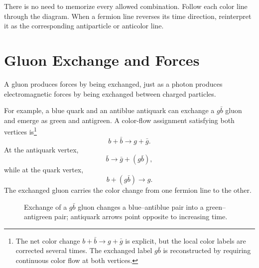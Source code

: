 There is no need to memorize every allowed combination. Follow each color line through the diagram. When a fermion line reverses its time direction, reinterpret it as the corresponding antiparticle or anticolor line.

\section{Gluon Exchange and Forces}

A gluon produces forces by being exchanged, just as a photon produces electromagnetic forces by being exchanged between charged particles.

For example, a blue quark and an antiblue antiquark can exchange a \(g\bar b\) gluon and emerge as green and antigreen. A color-flow assignment satisfying both vertices is\footnote{The net color change \(b+\bar b\longrightarrow g+\bar g\) is explicit, but the local color labels are corrected several times. The exchanged label \(g\bar b\) is reconstructed by requiring continuous color flow at both vertices.}
\begin{equation}
b+\bar b
\longrightarrow
g+\bar g.
\end{equation}
At the antiquark vertex,
\begin{equation}
\bar b\longrightarrow\bar g+(g\bar b),
\end{equation}
while at the quark vertex,
\begin{equation}
b+(g\bar b)\longrightarrow g.
\end{equation}
The exchanged gluon carries the color change from one fermion line to the other.

\begin{figure}[h]
\centering
{}
\caption{Exchange of a \(g\bar b\) gluon changes a blue--antiblue pair into a green--antigreen pair; antiquark arrows point opposite to increasing time.}
\end{figure}

